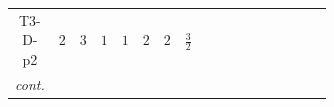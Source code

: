 \documentclass[8pt]{article}
\begin{document}
\begin{landscape}
\begin{longtable}{@{}cccccccc >{\raggedright\arraybackslash}p{0.21\linewidth} >{\raggedright\arraybackslash}p{0.21\linewidth} >{\raggedright\arraybackslash}p{0.21\linewidth}@{}}
T3-D-p2 & $2$ & $3$ & $1$ & $1$ & $2$ & $2$ & $\frac{3}{2}$ & \scriptsize\adjustbox{max width=\linewidth}{$\begin{gathered} +\frac{1}{2} H_{a_2} S_{1,j_2} H_{a_1}{}^{\dagger } S_{1,j_1}{}^{\dagger } \mathcal{I}_{H1,a_1,a_2,j_1,j_2}{}^1 \lambda_{HS_1}^{(1)}^{(1)} \\ +\frac{1}{2} H_{a_2} S_{1,j_2} H_{a_1}{}^{\dagger } S_{1,j_1}{}^{\dagger } \mathcal{I}_{H1,a_1,a_2,j_2,j_1}{}^1 \lambda_{HS_1}^{(1)}^{(1)} \\ +\frac{1}{2} H_{a_2} S_{1,j_2} H_{a_1}{}^{\dagger } S_{1,j_1}{}^{\dagger } \mathcal{I}_{H1,a_1,a_2,j_1,j_2}{}^2 \lambda_{HS_1}^{(1)}^{(2)}\end{gathered}$} & \scriptsize\adjustbox{max width=\linewidth}{$\begin{gathered} +S_2 S_{1,j_2} S_2{}^{\dagger } S_{1,j_1}{}^{\dagger } \mathcal{I}_{12,j_1,j_2}{}^1 \lambda_{12}^{(1)}^{(1)}\end{gathered}$} & \scriptsize\adjustbox{max width=\linewidth}{$\begin{gathered} +H_{a_2} S_2 H_{a_1}{}^{\dagger } S_2{}^{\dagger } \mathcal{I}_{H2,a_1,a_2}{}^1 \lambda_{HS_2}^{(1)}^{(1)}\end{gathered}$} \\
\textit{cont.} &  &  &  &  &  &  &  & \scriptsize\adjustbox{max width=\linewidth}{$\begin{gathered} +\frac{1}{2} H_{a_2} S_{1,j_2} H_{a_1}{}^{\dagger } S_{1,j_1}{}^{\dagger } \mathcal{I}_{H1,a_1,a_2,j_2,j_1}{}^2 \lambda_{HS_1}^{(1)}^{(2)}\end{gathered}$} &  &  \\
\midrule

\end{longtable}
\end{landscape}
\end{document}
